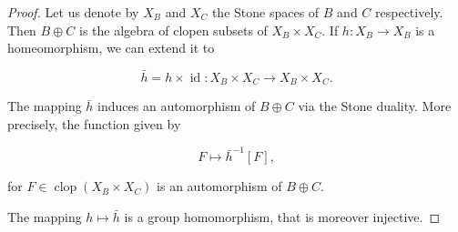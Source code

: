 \documentclass[10pt,a4paper]{amsart}
\begin{document}
\begin{proof}
	Let us denote by $X_B$ and $X_C$ the Stone spaces of $B$ and $C$ respectively.
	Then $B \oplus C$ is the algebra of clopen subsets of $X_B \times X_C$. If $h:X_B \longrightarrow X_B$ is a homeomorphism, we can extend it to
    
	$$\bar{h}=h \times \operatorname{id} :X_B \times X_C \longrightarrow X_B \times X_C.$$
	
	The mapping $\bar{h}$ induces an automorphism of $B\oplus C$ via the Stone duality. More precisely, the function given by
    
	$$F \mapsto \bar{h}^{-1}[F],$$
    
	for $F\in \operatorname{clop}(X_B \times X_C)$ is an automorphism of $B\oplus C$.

    The mapping $h  \mapsto \bar{h}$ is a group homomorphism, that is moreover injective.	
\end{proof}
\end{document}
